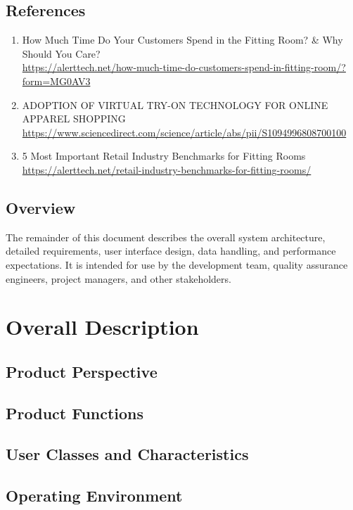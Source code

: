 \documentclass{scrreprt}
\begin{document}
\section{References}

\begin{enumerate}
    \item How Much Time Do Your Customers Spend in the Fitting Room? \& Why Should You Care? \\
\url{https://alerttech.net/how-much-time-do-customers-spend-in-fitting-room/?form=MG0AV3} 

\item ADOPTION OF VIRTUAL TRY-ON TECHNOLOGY FOR ONLINE APPAREL SHOPPING \\
\url{https://www.sciencedirect.com/science/article/abs/pii/S1094996808700100}

\item 5 Most Important Retail Industry Benchmarks for Fitting Rooms \\
\url{https://alerttech.net/retail-industry-benchmarks-for-fitting-rooms/}
\end{enumerate}

\section{Overview}
The remainder of this document describes the overall system architecture, detailed requirements, user interface design, data handling, and performance expectations. It is intended for use by the development team, quality assurance engineers, project managers, and other stakeholders.

\chapter{Overall Description}

\section{Product Perspective}
\section{Product Functions}
\section{User Classes and Characteristics}
\section{Operating Environment}
\end{document}
